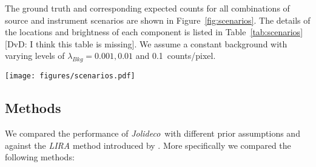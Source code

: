 \documentclass[twocolumn]{aastex631}
\newcommand{\chandra}{\textit{Chandra}~}
\newcommand{\chandranospace}{\textit{Chandra}}
\newcommand{\xmm}{\textit{XMM}~}
\newcommand{\jolideco}{\textit{Jolideco}~}
\newcommand{\dvd}[1]{{\color{red} [DvD: #1]}}
\begin{document}
    The ground truth and corresponding expected counts for all combinations of source and instrument scenarios are shown in Figure~\ref{fig:scenarios}. The details of the locations and brightness of each component is listed in Table~\ref{tab:scenarios} \dvd{I think this table is missing}. We assume a constant background with varying levels of $\lambda_{Bkg}= 0.001, 0.01$ and \qty[mode = text]{0.1}{counts/pixel}. 

    \begin{figure*}
        \centering\texttt{[image: figures/scenarios.pdf]}
        \caption{Illustration of the expected counts for the different source scenarios we used to generate test datasets. The source patterns shown are for the {\sl (A)}  {\tt points}, {\sl (B) {\tt asterism}}, {\sl (C)} {\tt shield}, and {\sl (D)} {\tt spiral} cases (see Section~\ref{sec:app:A}. For the \chandra instrument scenario we convolve the ground truth image with a narrow Gaussian shaped PSF of width $\sigma=2$~pix. For the \xmm scenario we used a Gaussian shaped PSF with a width of $\sigma=6$~pix and an effective area that is five times larger than that of \chandranospace. All images are of size $128{\times}128$ pixels.
        }
        \label{fig:scenarios}
    \end{figure*}
     
    \subsection{Methods}
    \label{subsec:methods}
    We compared the performance of \jolideco with different prior assumptions and against the \textit{LIRA} method introduced by \cite{Esch2004}. More specifically we compared the following methods:
\end{document}
